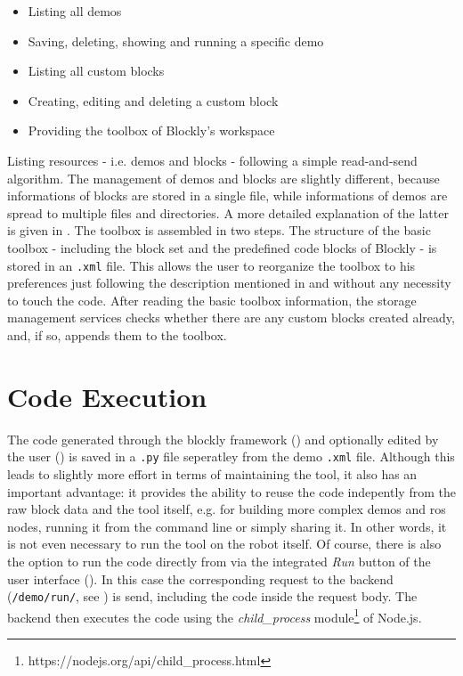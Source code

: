 \begin{itemize}
    \item Listing all demos
    \item Saving, deleting, showing and running a specific demo
    \item Listing all custom blocks
    \item Creating, editing and deleting a custom block
    \item Providing the toolbox of Blockly's workspace
\end{itemize}

Listing resources - i.e. demos and blocks - following a simple read-and-send algorithm. The management of demos and blocks are slightly different, because informations of blocks are stored in a single file, while informations of demos are spread to multiple files and directories. A more detailed explanation of the latter is given in . The toolbox is assembled in two steps. The structure of the basic toolbox - including the \hobbit{} block set and the predefined code blocks of Blockly - is stored in an \lstinline!.xml! file. This allows the user to reorganize the toolbox to his preferences just following the description mentioned in  and without any necessity to touch the code. After reading the basic toolbox information, the storage management services checks whether there are any custom blocks created already, and, if so, appends them to the toolbox.

\section{Code Execution} \label{sec:CodeExecution}
The code generated through the blockly framework () and optionally edited by the user () is saved in a \lstinline!.py! file seperatley from the demo \lstinline!.xml! file. Although this leads to slightly more effort in terms of maintaining the tool, it also has an important advantage: it provides the ability to reuse the code indepently from the raw block data and the tool itself, e.g. for building more complex demos and \gls{ros} nodes, running it from the command line or simply sharing it. In other words, it is not even necessary to run the tool on the robot itself. Of course, there is also the option to run the code directly from \toolname{} via the integrated \textit{Run} button of the user interface (). In this case the corresponding request to the backend (\lstinline!/demo/run/!, see ) is send, including the code inside the request body. The backend then executes the code using the \textit{child\_process} module\footnote{https://nodejs.org/api/child\_process.html} of Node.js.